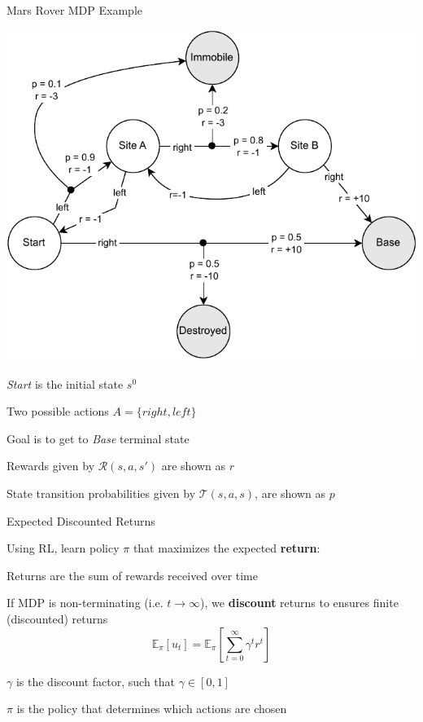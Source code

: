 \begin{frame}[t]{Mars Rover MDP Example}
	\vspace{10pt}
	
    \bcol
    
          \includegraphics[width=1\textwidth]{images/chapter_2/mdp-rover.pdf}
    
      \small
        \blist
          \item \textit{Start} is the initial state \(s^0\)
          \item Two possible actions \(A = \{right, left\}\)
          \item Goal is to get to \textit{Base} terminal state
          \item Rewards given by $\mathcal{R}(s, a, s')$ are shown as $r$
          \item State transition probabilities given by $\mathcal{T}(s, a, s)$, are shown as $p$
        \elist
    
    \ecol
\end{frame}

\begin{frame}{Expected Discounted Returns}

    Using RL, learn policy $\pi$ that maximizes the expected \textbf{return}:

    \blist
        \item Returns are the sum of rewards received over time
        \item If MDP is non-terminating (i.e. $t \to \infty$), we \textbf{discount} returns to ensures finite (discounted) returns
    \elist
    \vspace{0pt}
    $$
    \mathbb{E}_{\pi}[u_{t}] = \mathbb{E}_{\pi}\left[\sum_{t=0}^{\infty}\gamma^t r^t\right]
    $$

    \blist
        \item $\gamma$ is the discount factor, such that $\gamma \in [0, 1]$
        \item $\pi$ is the policy that determines which actions are chosen
    \elist
\end{frame}

